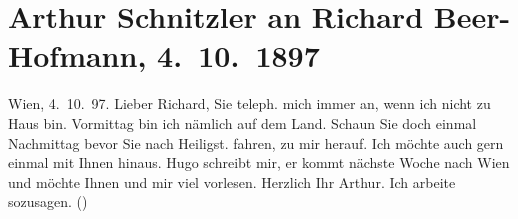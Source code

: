 

         
         \renewcommand{\erwaehntePersonen}{Personen: Richard Beer-Hofmann, Hugo von Hofmannsthal}
         \renewcommand{\erwaehnteOrte}{Orte: Heiligenstadt, Wien, Wollzeile}
         \renewcommand{\erwaehnteWerke}{}
               \section[Arthur Schnitzler an Richard Beer-Hofmann, 4. 10. 1897]{ Arthur Schnitzler an Richard Beer-Hofmann, 4. 10. 1897}\nopagebreak{}\rehead{ }\begin{ledgroupsized}[t]{13cm}\normalsize\beginnumbering \toendnotes[C]{\smallbreak\pagebreak[2]} 
\toendnotes[C]{\smallbreak}\pstart
           \raggedleft{}{\pb}Wien, 4. 10. 97.\pend
           \pstart
           Lieber Richard, Sie teleph. mich immer an, wenn ich nicht zu Haus
               bin. Vormittag bin ich nämlich auf dem Land. Schaun Sie doch einmal Nachmittag bevor
               Sie nach Heiligst. fahren, zu mir herauf. Ich möchte
               auch gern einmal mit Ihnen hinaus. Hugo schreibt
               mir, er kommt nächste Woche nach Wien und möchte
               Ihnen und mir viel vorlesen.\pend
           \pstart
           Herzlich Ihr \spacefill\mbox{Arthur.}\pend
           \pstart
           \noindent{}Ich arbeite sozusagen.\pend
           \pstart
           (\label{T_L00729_1v}\label{T_L00729_1h})\pend
           
         
         \endnumbering{}\end{ledgroupsized}  \newcommand{\dateiname}{L00729}\newcommand{\titel}{Arthur Schnitzler an Richard Beer-Hofmann, 4. 10. 1897}\newcommand{\editorInnen}{Martin Anton Müller und Gerd-Hermann Susen}
      